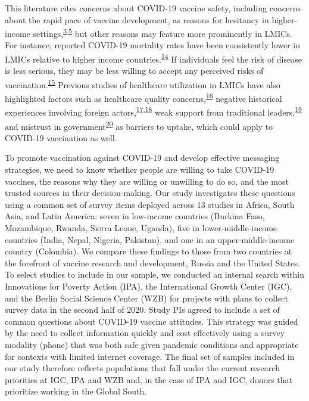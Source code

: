 \documentclass[
  12pt,
]{article}
\begin{document}
This literature cites concerns about COVID-19 vaccine safety, including concerns about the rapid pace of vaccine development, as reasons for hesitancy in higher-income settings,\textsuperscript{\protect\hyperlink{ref-wouters2021challenges}{3},\protect\hyperlink{ref-boyon2020ipsos}{5}} but other reasons may feature more prominently in LMICs. For instance, reported COVID-19 mortality rates have been consistently lower in LMICs relative to higher income countries.\textsuperscript{\protect\hyperlink{ref-mukherjee}{14}} If individuals feel the risk of disease is less serious, they may be less willing to accept any perceived risks of vaccination.\textsuperscript{\protect\hyperlink{ref-brewer2007meta}{15}} Previous studies of healthcare utilization in LMICs have also highlighted factors such as healthcare quality concerns,\textsuperscript{\protect\hyperlink{ref-christensen2020building}{16}} negative historical experiences involving foreign actors,\textsuperscript{\protect\hyperlink{ref-Lowes2018}{17},\protect\hyperlink{ref-martinez2021vaccines}{18}} weak support from traditional leaders,\textsuperscript{\protect\hyperlink{ref-Jegede2007}{19}} and mistrust in government\textsuperscript{\protect\hyperlink{ref-BLAIR201789}{20}} as barriers to uptake, which could apply to COVID-19 vaccination as well.

To promote vaccination against COVID-19 and develop effective messaging strategies, we need to know whether people are willing to take COVID-19 vaccines, the reasons why they are willing or unwilling to do so, and the most trusted sources in their decision-making. Our study investigates these questions using a common set of survey items deployed across 13 studies in Africa, South Asia, and Latin America: seven in low-income countries (Burkina Faso, Mozambique, Rwanda, Sierra Leone, Uganda), five in lower-middle-income countries (India, Nepal, Nigeria, Pakistan), and one in an upper-middle-income country (Colombia). We compare these findings to those from two countries at the forefront of vaccine research and development, Russia and the United States.
To select studies to include in our sample, we conducted an internal search within Innovations for Poverty Action (IPA), the International Growth Center (IGC), and the Berlin Social Science Center (WZB) for projects with plans to collect survey data in the second half of 2020. Study PIs agreed to include a set of common questions about COVID-19 vaccine attitudes. This strategy was guided by the need to collect information quickly and cost effectively using a survey modality (phone) that was both safe given pandemic conditions and appropriate for contexts with limited internet coverage. The final set of samples included in our study therefore reflects populations that fall under the current research priorities at IGC, IPA and WZB and, in the case of IPA and IGC, donors that prioritize working in the Global South.
\end{document}
